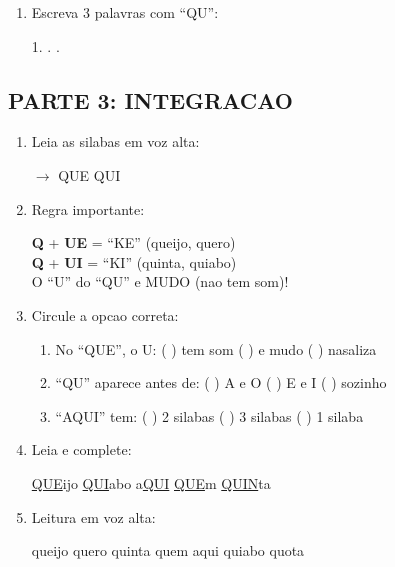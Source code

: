 \begin{exercicio}
\begin{enumerate}[resume]
  \item Escreva 3 palavras com ``QU'':
  \begin{center}
  1. \underline{\hspace{4cm}} . \underline{\hspace{4cm}} . \underline{\hspace{4cm}}
  \end{center}
\end{enumerate}

\subsection*{PARTE 3: INTEGRACAO}

\begin{enumerate}[resume]
  \item Leia as silabas em voz alta:
  \begin{center}
  $\rightarrow$ QUE \quad QUI
  \end{center}

  \item Regra importante:
  \begin{center}
  \textbf{Q} + \textbf{UE} = ``KE'' (queijo, quero)\\
  \textbf{Q} + \textbf{UI} = ``KI'' (quinta, quiabo)\\
  O ``U'' do ``QU'' e MUDO (nao tem som)!
  \end{center}

  \item Circule a opcao correta:
  \begin{enumerate}[label=(\alph*)]
    \item No ``QUE'', o U: ( ) tem som ( ) e mudo ( ) nasaliza
    \item ``QU'' aparece antes de: ( ) A e O ( ) E e I ( ) sozinho
    \item ``AQUI'' tem: ( ) 2 silabas ( ) 3 silabas ( ) 1 silaba
  \end{enumerate}

  \item Leia e complete:
  \begin{center}
  \underline{QUE}ijo \quad \underline{QUI}abo \quad a\underline{QUI} \quad \underline{QUE}m \quad \underline{QUIN}ta
  \end{center}

  \item Leitura em voz alta:
  \begin{center}
  queijo \quad quero \quad quinta \quad quem \quad aqui \quad quiabo \quad quota
  \end{center}
\end{enumerate}
\end{exercicio}

